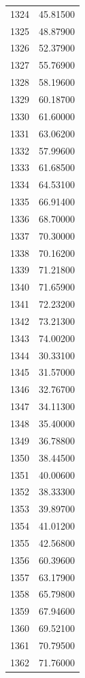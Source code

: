 \documentclass[
  letterpaper,
  DIV=11,
  numbers=noendperiod]{scrreprt}
\begin{document}
\begin{tcolorbox}
\begin{tabular}{lr}
1324 &         45.81500 \\
1325 &         48.87900 \\
1326 &         52.37900 \\
1327 &         55.76900 \\
1328 &         58.19600 \\
1329 &         60.18700 \\
1330 &         61.60000 \\
1331 &         63.06200 \\
1332 &         57.99600 \\
1333 &         61.68500 \\
1334 &         64.53100 \\
1335 &         66.91400 \\
1336 &         68.70000 \\
1337 &         70.30000 \\
1338 &         70.16200 \\
1339 &         71.21800 \\
1340 &         71.65900 \\
1341 &         72.23200 \\
1342 &         73.21300 \\
1343 &         74.00200 \\
1344 &         30.33100 \\
1345 &         31.57000 \\
1346 &         32.76700 \\
1347 &         34.11300 \\
1348 &         35.40000 \\
1349 &         36.78800 \\
1350 &         38.44500 \\
1351 &         40.00600 \\
1352 &         38.33300 \\
1353 &         39.89700 \\
1354 &         41.01200 \\
1355 &         42.56800 \\
1356 &         60.39600 \\
1357 &         63.17900 \\
1358 &         65.79800 \\
1359 &         67.94600 \\
1360 &         69.52100 \\
1361 &         70.79500 \\
1362 &         71.76000 \\

\end{tabular}
\end{tcolorbox}
\end{document}
